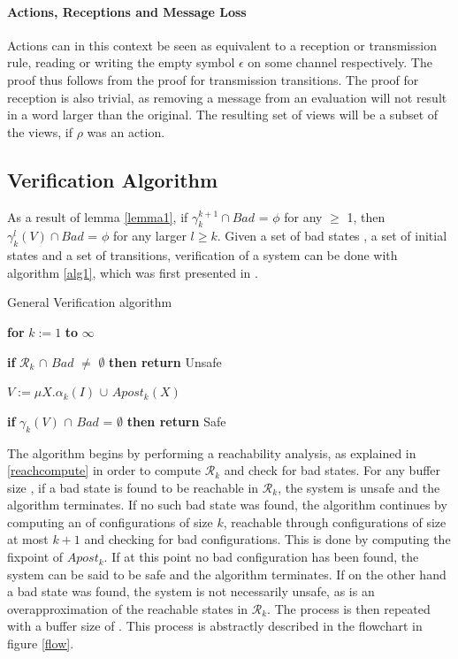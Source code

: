 \paragraph{Actions, Receptions and Message Loss}
\label{proofreception}
Actions can in this context be seen as equivalent to a reception or transmission rule, reading or writing the empty symbol $\epsilon$ on some channel respectively. The proof thus follows from the proof for transmission transitions. The proof for reception is also trivial, as removing a message from an evaluation will not result in a word larger than the original. The resulting set of views will be a subset of the views, if $\rho$ was an action.



\subsection{Verification Algorithm}
\label{verificationalgorithm}
As a result of lemma \ref{lemma1}, if $\gamma_k^{k+1} \cap Bad$ = $\phi$ for any  $\geq$ 1, then $\gamma_k^l(V) \cap Bad$ = $\phi$ for any larger $l \geq k$. Given a set of bad states , a set of initial states  and a set of transitions, verification of a system can be done with algorithm \ref{alg1}, which was first presented in \cite{parosh}.

\begin{algorithm}
  \caption{General Verification algorithm}
  \label{alg1}
    \hspace{8pt}\textbf{for} $k := 1$ \textbf{to} $\infty$

    \hspace{16pt}\textbf{if} $\mathcal{R}_k$ $\cap$ $Bad$ $\neq$ $\emptyset$ \textbf{then return} Unsafe

    \hspace{16pt}$V := \mu X.\alpha_k(I)$ $\cup$ $Apost_k(X)$

    \hspace{16pt}\textbf{if} {$\gamma_k(V)$ $\cap$ $Bad$ = $\emptyset$} \textbf{then return} Safe
\end{algorithm}

The algorithm begins by performing a reachability analysis, as explained in \ref{reachcompute} in order to compute $\mathcal{R}_k$ and check for bad states. For any buffer size , if a bad state is found to be reachable in $\mathcal{R}_k$, the system is unsafe and the algorithm terminates. If no such bad state was found, the algorithm continues by computing an  of configurations of size $k$, reachable through configurations of size at most $k+1$ and checking for bad configurations. This is done by computing the fixpoint of $Apost_k$. If at this point no bad configuration has been found, the system can be said to be safe and the algorithm terminates. If on the other hand a bad state was found, the system is not necessarily unsafe, as  is an overapproximation of the reachable states in $\mathcal{R}_k$. The process is then repeated with a buffer size of . This process is abstractly described in the flowchart in figure \ref{flow}.

